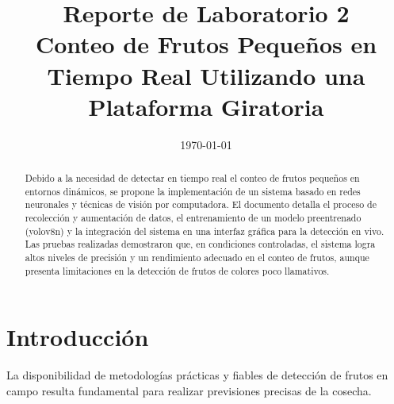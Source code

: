 \documentclass[conference]{IEEEtran}
\date{\specialdate\today}
\begin{document}
\newcommand{\breite}{0.9} %
\newcommand{\RelacionFiguradoscolumnas}{0.9}
\newcommand{\RelacionFiguradoscolumnasPuntoCinco}{0.45}

\title{Reporte de Laboratorio 2 \\ Conteo de Frutos Pequeños en Tiempo Real Utilizando una Plataforma Giratoria}

\author{

}

\maketitle

\begin{abstract} 
Debido a la necesidad de detectar en tiempo real el conteo de frutos pequeños en entornos dinámicos, se propone la implementación de un sistema basado en redes neuronales y técnicas de visión por computadora. El documento detalla el proceso de recolección y aumentación de datos, el entrenamiento de un modelo preentrenado (yolov8n) y la integración del sistema en una interfaz gráfica para la detección en vivo. Las pruebas realizadas demostraron que, en condiciones controladas, el sistema logra altos niveles de precisión y un rendimiento adecuado en el conteo de frutos, aunque presenta limitaciones en la detección de frutos de colores poco llamativos.
\end{abstract}

\section{Introducción}
La disponibilidad de metodologías prácticas y fiables de detección de frutos en campo resulta fundamental para realizar previsiones precisas de la cosecha\cite{deteccionFrutosGRAP}. 
\end{document}
